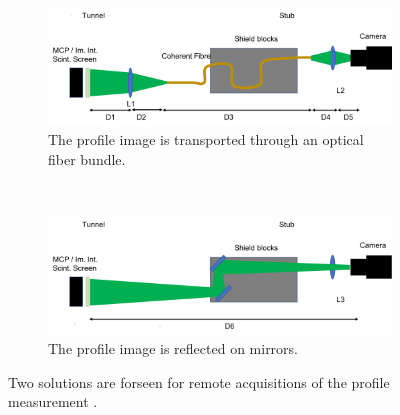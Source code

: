 \begin{figure}[!ht]
	\begin{subfigure}[t]{0.5\textwidth}
		\includegraphics[width=\textwidth]{05_Conclusion/figures/fig000_schematic_coherentr_fiber}
		\caption{The profile image is transported through an optical fiber bundle.}
		\label{chap5:fig:schematic:1}
	\end{subfigure}
	~
	\begin{subfigure}[t]{0.5\textwidth}
    \includegraphics[width=\textwidth]{05_Conclusion/figures/fig000_schematic_telescop_lens}
		\caption{The profile image is reflected on mirrors.}
		\label{chap5:fig:schematic:2}
	\end{subfigure}
	\caption[Two solutions are forseen for remote acquisitions of the profile measurement]{Two solutions are forseen for remote acquisitions of the profile measurement \cite{CyrilleCDR2019}.}
	\label{chap5:fig:schematic}
\end{figure}
